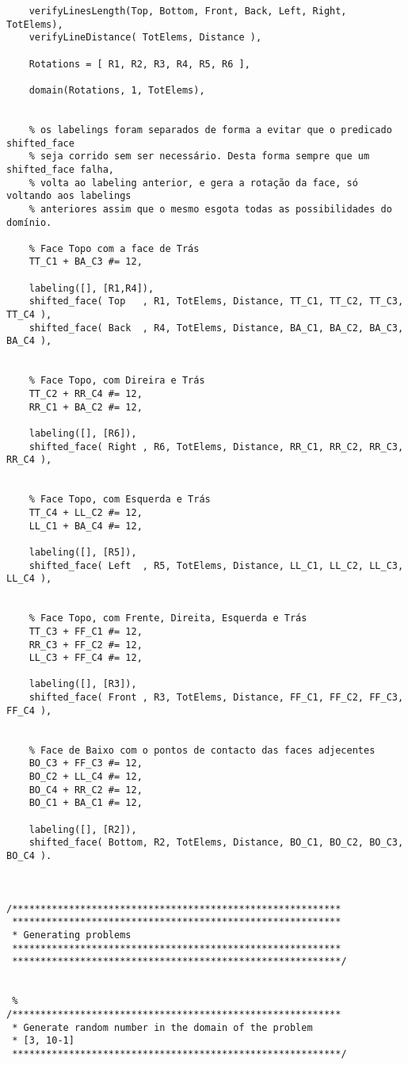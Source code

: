 \begin{lstlisting}
	verifyLinesLength(Top, Bottom, Front, Back, Left, Right, TotElems),
	verifyLineDistance( TotElems, Distance ),

	Rotations = [ R1, R2, R3, R4, R5, R6 ],

	domain(Rotations, 1, TotElems),

	
	% os labelings foram separados de forma a evitar que o predicado shifted_face
	% seja corrido sem ser necessário. Desta forma sempre que um shifted_face falha,
	% volta ao labeling anterior, e gera a rotação da face, só voltando aos labelings
	% anteriores assim que o mesmo esgota todas as possibilidades do domínio.
	
	% Face Topo com a face de Trás
	TT_C1 + BA_C3 #= 12,
	
	labeling([], [R1,R4]),
	shifted_face( Top   , R1, TotElems, Distance, TT_C1, TT_C2, TT_C3, TT_C4 ),
	shifted_face( Back  , R4, TotElems, Distance, BA_C1, BA_C2, BA_C3, BA_C4 ),
	
	
	% Face Topo, com Direira e Trás 
	TT_C2 + RR_C4 #= 12,
	RR_C1 + BA_C2 #= 12,
	
	labeling([], [R6]),
	shifted_face( Right , R6, TotElems, Distance, RR_C1, RR_C2, RR_C3, RR_C4 ),
	

	% Face Topo, com Esquerda e Trás
	TT_C4 + LL_C2 #= 12,
	LL_C1 + BA_C4 #= 12,
	
	labeling([], [R5]),
	shifted_face( Left  , R5, TotElems, Distance, LL_C1, LL_C2, LL_C3, LL_C4 ),

	
	% Face Topo, com Frente, Direita, Esquerda e Trás
	TT_C3 + FF_C1 #= 12,
	RR_C3 + FF_C2 #= 12,
	LL_C3 + FF_C4 #= 12,
	
	labeling([], [R3]),
	shifted_face( Front , R3, TotElems, Distance, FF_C1, FF_C2, FF_C3, FF_C4 ),


	% Face de Baixo com o pontos de contacto das faces adjecentes
	BO_C3 + FF_C3 #= 12,
	BO_C2 + LL_C4 #= 12,
	BO_C4 + RR_C2 #= 12,
	BO_C1 + BA_C1 #= 12,
	
	labeling([], [R2]),
	shifted_face( Bottom, R2, TotElems, Distance, BO_C1, BO_C2, BO_C3, BO_C4 ).

	
	
/**********************************************************
 **********************************************************
 * Generating problems
 **********************************************************
 **********************************************************/
 
 
 %
/**********************************************************
 * Generate random number in the domain of the problem
 * [3, 10-1]
 **********************************************************/
 

\end{lstlisting}

